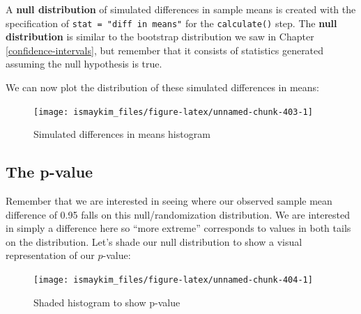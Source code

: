 \documentclass[12pt,]{krantz}
\makeatletter
\newenvironment{Shaded}{\begin{snugshade}}{\end{snugshade}}
\newcommand{\KeywordTok}[1]{\textcolor[rgb]{0.27,0.27,0.27}{\textbf{#1}}}
\newcommand{\DataTypeTok}[1]{\textcolor[rgb]{0.27,0.27,0.27}{#1}}
\newcommand{\StringTok}[1]{\textcolor[rgb]{0.5,0.5,0.5}{#1}}
\newcommand{\OperatorTok}[1]{\textcolor[rgb]{0.43,0.43,0.43}{\textbf{#1}}}
\newcommand{\NormalTok}[1]{#1}
\newenvironment{kframe}{%
\medskip{}
\setlength{\fboxsep}{.8em}
 \def\at@end@of@kframe{}%
 \ifinner\ifhmode%
  \def\at@end@of@kframe{\end{minipage}}%
  \begin{minipage}{\columnwidth}%
 \fi\fi%
 \def\FrameCommand##1{\hskip\@totalleftmargin \hskip-\fboxsep
 \colorbox{shadecolor}{##1}\hskip-\fboxsep
     \hskip-\linewidth \hskip-\@totalleftmargin \hskip\columnwidth}%
 \MakeFramed {\advance\hsize-\width
   \@totalleftmargin\z@ \linewidth\hsize
   \@setminipage}}%
 {\par\unskip\endMakeFramed%
 \at@end@of@kframe}
\renewenvironment{Shaded}{\begin{kframe}}{\end{kframe}}
\makeatother
\begin{document}
A \textbf{null distribution} of simulated differences in sample means is
created with the specification of \texttt{stat\ =\ "diff\ in\ means"}
for the \texttt{calculate()} step. The \textbf{null distribution} is
similar to the bootstrap distribution we saw in Chapter
\ref{confidence-intervals}, but remember that it consists of statistics
generated assuming the null hypothesis is true.

We can now plot the distribution of these simulated differences in
means:

\begin{Shaded}
\end{Shaded}

\begin{figure}

{\centering \texttt{[image: ismaykim\_files/figure-latex/unnamed-chunk-403-1]} 

}

\caption{Simulated differences in means histogram}\label{fig:unnamed-chunk-403}
\end{figure}

\subsection{The p-value}\label{the-p-value}

Remember that we are interested in seeing where our observed sample mean
difference of 0.95 falls on this null/randomization distribution. We are
interested in simply a difference here so ``more extreme'' corresponds
to values in both tails on the distribution. Let's shade our null
distribution to show a visual representation of our \(p\)-value:

\begin{Shaded}
\end{Shaded}

\begin{figure}

{\centering \texttt{[image: ismaykim\_files/figure-latex/unnamed-chunk-404-1]} 

}

\caption{Shaded histogram to show p-value}\label{fig:unnamed-chunk-404}
\end{figure}
\end{document}

